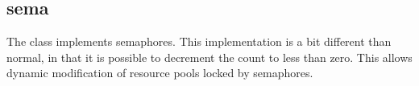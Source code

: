 %
%
%
%
%              

\subsection{sema}
\label{sema}

The  class implements semaphores.  This implementation is a bit
different than normal, in that it is possible to decrement the count to less
than zero.  This allows dynamic modification of resource pools locked by
semaphores.

